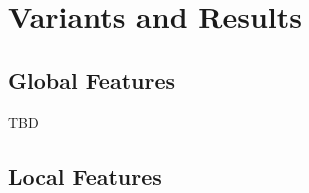 \section{Variants and Results}\label{sec:results}

\subsection{Global Features}

TBD

\subsection{Local Features}

\begin{figure}[h]
    
    \caption[canny stuff]{
    }
    \label{fig:pipeline_local_luma_canny_pmean_l2}
\end{figure}
